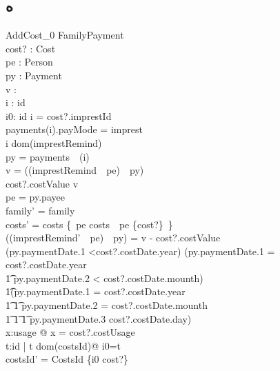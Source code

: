 \documentclass{article}
\begin{document}
\subsection*{ه}

\begin{schema}{AddCost_0}
\Delta FamilyPayment\\
cost? : Cost\\
pe : Person\\
py : Payment\\
v : \nat\\
i : id\\
i0: id
\where
i = cost?.imprestId\\
payments(i).payMode = imprest\\
i \in dom(imprestRemind)\\
py = payments~~(i)\\
v = ((imprestRemind~~pe)~~py)\\
cost?.costValue \le v\\
pe = py.payee\\
family' = family\\
costs' = costs \oplus \{~pe \mapsto costs~~pe \cup \{cost?\}~\}\\
((imprestRemind'~~pe)~~py) = v - cost?.costValue\\
(py.paymentDate.1 <cost?.costDate.year) \lor (py.paymentDate.1  = cost?.costDate.year \land \\
\t1 py.paymentDate.2 < cost?.costDate.mounth) \lor\\
\t1(py.paymentDate.1  = cost?.costDate.year \land\\
\t1 \t1 py.paymentDate.2 = cost?.costDate.mounth\land\\
\t1 \t1 \t1 py.paymentDate.3 \le cost?.costDate.day)\\
\exists x:usage @ x = cost?.costUsage\\
\exists t:id | t \notin dom(costsId)@ i0=t\\
costsId' = CostsId \cup \{i0 \mapsto cost?\}
\end{schema}
\end{document}
